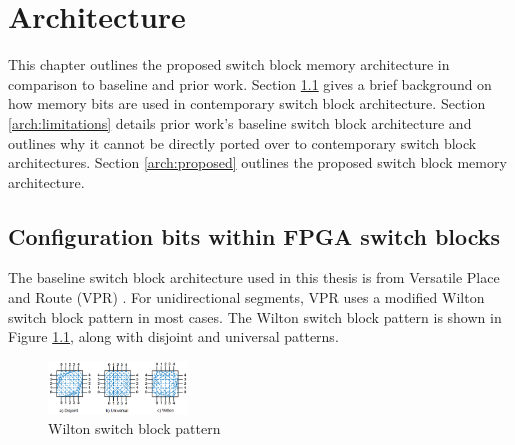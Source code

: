 
\chapter{Architecture}
\label{ch:Architecture}

This chapter outlines the proposed switch block memory architecture in comparison to baseline and prior work. Section \ref{arch:baseline} gives a brief background on how memory bits are used in contemporary switch block architecture. Section \ref{arch:limitations} details prior work's baseline switch block architecture and outlines why it cannot be directly ported over to contemporary switch block architectures. Section \ref{arch:proposed} outlines the proposed switch block memory architecture.

\section{Configuration bits within FPGA switch blocks}
\label{arch:baseline}
The baseline switch block architecture used in this thesis is from Versatile Place and Route (VPR) \cite{Murray2020VTRModelling}. 
For unidirectional segments, VPR uses a modified Wilton switch block pattern \cite{Wilton1997ArchitecturesMemory} in most cases. The Wilton switch block pattern is shown in Figure \ref{fig:wiltonswitchblock}, along with disjoint and universal patterns.
\begin{figure}[!tb]
    \centering
    \includegraphics[width=0.33\textwidth]{fig/switchblocks.png}
    \caption{Wilton switch block pattern \cite{Yu2017FPGATargetability}}
    \label{fig:wiltonswitchblock}
\end{figure}

